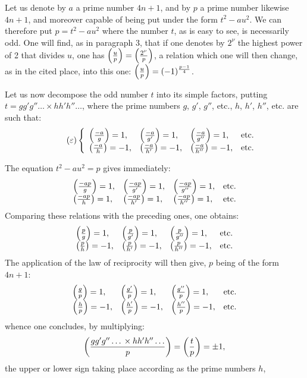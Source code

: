 \par\indent
Let us denote by $a$ a prime number $4n+1$, and by $p$ a prime number likewise $4n+1$, and
moreover capable of being put under the form $t^2-au^2$. We can therefore put $p=t^2-au^2$ where
the number $t$, as is easy to see, is necessarily odd. One will find, as in paragraph 3, that if
one denotes by $2^\nu$ the highest power of 2 that divides $u$, one has
$\left(\frac{u}{p}\right)=\left(\frac{2^\nu}{p}\right)$, a relation which one will then change, as in the cited place, into
this one: $\left(\frac{u}{p}\right)=(-1)^{\frac{p-1}{4}}$.
\par\indent
Let us now decompose the odd number $t$ into its simple factors, putting $t=gg'g''\ldots{}\times
hh'h''\ldots$, where the prime numbers $g$, $g'$, $g''$, etc., $h$, $h'$, $h''$, etc. are such
that:
\begin{equation*}\tag{$\varepsilon$}
\left\{
\begin{array}{llll}
\left(\frac{-a}{g}\right)=1,& \left(\frac{-a}{g'}\right)=1,& \left(\frac{-a}{g''}\right)=1,& \text{etc.}\\[0.3em]
\left(\frac{-a}{h}\right)=-1,& \left(\frac{-a}{h'}\right)=-1,& \left(\frac{-a}{h''}\right)=-1,& \text{etc.}
\end{array}
\right.
\end{equation*}
\par\noindent
The equation $t^2-au^2=p$ gives immediately:
\[
\begin{array}{llll}
\left(\frac{-ap}{g}\right)=1,& \left(\frac{-ap}{g'}\right)=1,& \left(\frac{-ap}{g''}\right)=1,& \text{etc.}\\[0.3em]
\left(\frac{-ap}{h}\right)=1,& \left(\frac{-ap}{h'}\right)=1,& \left(\frac{-ap}{h''}\right)=1,& \text{etc.}
\end{array}
\]
Comparing these relations with the preceding ones, one obtains:
\[
\begin{array}{llll}
\left(\frac{p}{g}\right)=1,& \left(\frac{p}{g'}\right)=1,& \left(\frac{p}{g''}\right)=1,& \text{etc.}\\[0.3em]
\left(\frac{p}{h}\right)=-1,& \left(\frac{p}{h'}\right)=-1,& \left(\frac{p}{h''}\right)=-1,& \text{etc.}
\end{array}
\]
The application of the law of reciprocity will then give, $p$ being of the form $4n+1$:
\[
\begin{array}{llll}
\left(\frac{g}{p}\right)=1,& \left(\frac{g'}{p}\right)=1,& \left(\frac{g''}{p}\right)=1,& \text{etc.}\\[0.3em]
\left(\frac{h}{p}\right)=-1,& \left(\frac{h'}{p}\right)=-1,& \left(\frac{h''}{p}\right)=-1,& \text{etc.}
\end{array}
\]
whence one concludes, by multiplying:
\[
\left(\frac{gg'g''\ldots{}\times hh'h''\ldots}{p}\right)=\left(\frac{t}{p}\right)=\pm1,
\]
the upper or lower sign taking place according as the prime numbers $h$,
